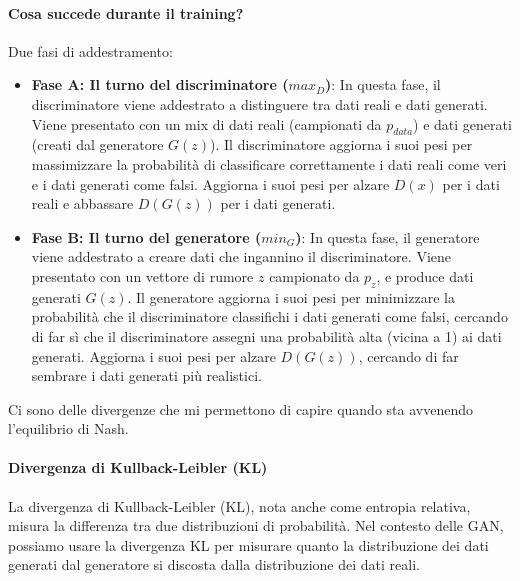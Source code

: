 \paragraph{Cosa succede durante il training?}
Due fasi di addestramento:
\begin{itemize}
    \item \textbf{Fase A: Il turno del discriminatore ($max_D$)}: In questa fase, il discriminatore viene addestrato a distinguere tra dati reali e dati generati. Viene presentato con un mix di dati reali (campionati da $p_{data}$) e dati generati (creati dal generatore $G(z)$). Il discriminatore aggiorna i suoi pesi per massimizzare la probabilità di classificare correttamente i dati reali come veri e i dati generati come falsi. Aggiorna i suoi pesi per alzare $D(x)$ per i dati reali e abbassare $D(G(z))$ per i dati generati.
    \item \textbf{Fase B: Il turno del generatore ($min_G$)}: In questa fase, il generatore viene addestrato a creare dati che ingannino il discriminatore. Viene presentato con un vettore di rumore $z$ campionato da $p_z$, e produce dati generati $G(z)$. Il generatore aggiorna i suoi pesi per minimizzare la probabilità che il discriminatore classifichi i dati generati come falsi, cercando di far sì che il discriminatore assegni una probabilità alta (vicina a 1) ai dati generati. Aggiorna i suoi pesi per alzare $D(G(z))$, cercando di far sembrare i dati generati più realistici.
\end{itemize}

Ci sono delle divergenze che mi permettono di capire quando sta avvenendo l'equilibrio di Nash.
\paragraph{Divergenza di Kullback-Leibler (KL)}
La divergenza di Kullback-Leibler (KL), nota anche come entropia relativa, misura la differenza tra due distribuzioni di probabilità. Nel contesto delle GAN, possiamo usare la divergenza KL per misurare quanto la distribuzione dei dati generati dal generatore si discosta dalla distribuzione dei dati reali.\\

